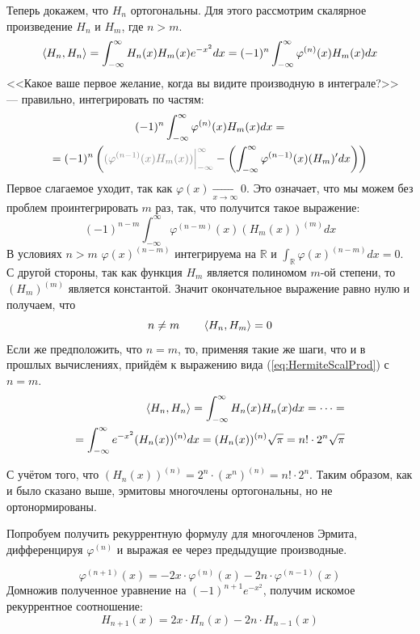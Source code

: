 \documentclass[12pt]{article}
\begin{document}
			Теперь докажем, что $H_n$ ортогональны. Для этого рассмотрим скалярное произведение $H_n$ и $H_m$, где $n > m$.
			$$\left\langle H_n, H_n \right\rangle = \int_{-\infty}^{\infty} H_n(x) H_m(x) e^{-x^2} dx = (-1)^n \int_{-\infty}^{\infty} \varphi^{(n)}(x) H_m(x) dx$$
			<<Какое ваше первое желание, когда вы видите производную в интеграле?>> --- правильно, интегрировать по частям:
			\begin{gather*}
				(-1)^n \int_{-\infty}^{\infty} \varphi^{(n)}(x) H_m(x) dx = \\
				= (-1)^n \left( {\color{gray}(\varphi^{(n-1)}(x) H_m(x)) \lims{-\infty}{\infty}}
				- \left(\int_{-\infty}^{\infty} \varphi^{(n-1)}(x) (H_m)' dx \right) \right)
			\end{gather*}
			Первое слагаемое уходит, так как $\varphi(x) \underset{x \rightarrow \infty}{\rightarrow} 0$. Это означает, что мы можем без проблем
			проинтегрировать $m$ раз, так, что получится такое выражение:
			\begin{equation} \label{eq:HermiteScalProd}
				(-1)^{n-m} \int_{-\infty}^{\infty} \varphi^{(n-m)}(x) (H_m(x))^{(m)} dx
			\end{equation}
			В условиях $n > m$ $\varphi(x)^{(n-m)}$ интегрируема на $\mathbb{R}$ и $\int_{\mathbb{R}} \varphi(x)^{(n-m)} dx = 0$. С другой 
			стороны, так как функция $H_m$ является полиномом $m$-ой степени, то $(H_m)^{(m)}$ является константой. Значит окончательное выражение
			равно нулю и получаем, что
			$$n \neq m \qquad \left\langle H_n, H_m \right\rangle = 0$$
			Если же предположить, что $n=m$, то, применяя такие же шаги, что и в прошлых вычислениях, прийдём к выражению вида 
			(\ref{eq:HermiteScalProd}) с $n=m$. 
			\begin{align*}
				\left\langle H_n, H_n \right\rangle = \int_{-\infty}^{\infty} H_n(x) H_n(x) dx = \dots = \\
				= \int_{-\infty}^{\infty} e^{-x^2} (H_n(x))^{(n)} dx = (H_n(x))^{(n)} \sqrt{\pi} = n! \cdot 2^n \sqrt{\pi}
			\end{align*}
	
			С учётом того, что $(H_n(x))^{(n)} = 2^n \cdot (x^n)^{(n)} = n! \cdot 2^n$. Таким образом, как 
			и было сказано выше, эрмитовы многочлены ортогональны, но не ортонормированы.
	
			Попробуем получить рекуррентную формулу для многочленов Эрмита, дифференцируя $\varphi^{(n)}$ и выражая ее через предыдущие
			производные.
	
			$$ \varphi^{(n+1)}(x) = -2x \cdot \varphi^{(n)}(x) - 2n \cdot \varphi^{(n-1)}(x) $$
			Домножив полученное уравнение на $(-1)^{n+1} e^{-x^2}$, получим искомое рекуррентное соотношение:
			$$H_{n+1} (x) = 2x \cdot H_n(x) - 2n \cdot H_{n-1} (x)$$
	
\end{document}
